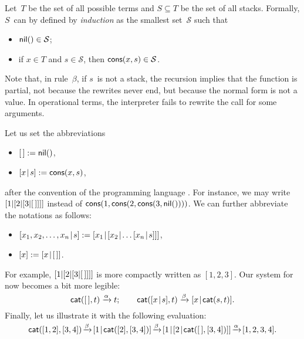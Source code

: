 Let~\(T\) be the set of all possible terms and \(S \subseteq T\) be
the set of all stacks. Formally, \(S\)~can by defined by
\emph{induction} as the smallest set~\(\mathcal{S}\) such
that
\begin{itemize}

  \item \(\textsf{nil}() \in \mathcal{S}\);\label{def:stack}

  \item if \(x \in T\) and \(s \in \mathcal{S}\), then
    \(\textsf{cons}(x,s) \in \mathcal{S}\).

\end{itemize}

Note that, in rule~\(\beta\), if \(s\)~is not a stack, the recursion
implies that the function  is partial, not because the
rewrites never end, but because the normal form is not a value. In operational terms, the
interpreter fails to rewrite the call for some arguments.

Let us set the abbreviations
\begin{itemize}

  \item \([\,] := \textsf{nil}()\),

  \item \([{x}\!\mid\!{s}] := \textsf{cons}(x,s)\),

\end{itemize}
after the convention of the programming language \Prolog
\citep{SterlingShapiro_1994,Bratko_2000}. For instance, we may write
\([1|[2|[3|[\,]]]]\) instead of
\(\textsf{cons}(1,\textsf{cons}(2,\textsf{cons}(3,\textsf{nil}())))\).  We can
further abbreviate the notations as follows:
\begin{itemize}

  \item \(\cons{x_1,x_2,\dots,x_n}{s} := \cons{x_1}{\cons{x_2}{\dots
      \cons{x_n}{s}}}\),

  \item \([x] := [{x}\!\mid\!{[\,]}]\).

\end{itemize}
For example, \([1|[2|[3|[\,]]]]\) is more compactly written as
\([1,2,3]\). Our system for  now
becomes a bit more legible:
\begin{equation}
\fun{cat}(        \el,t) \xrightarrow{\smash{\alpha}} t;\qquad
\fun{cat}(\cons{x}{s},t) \xrightarrow{\smash{\beta}}
\cons{x}{\fun{cat}(s,t)}.
\label{def:cat}\index{stack!concatenation!definition}
\end{equation}
Finally, let us illustrate it with the following
evaluation:
\begin{equation*}
\fun{cat}([1,2],[3,4])
\!\xrightarrow{\smash{\beta}}\!
\cons{1}{\fun{cat}([2],[3,4])}
\!\xrightarrow{\smash{\beta}}\!
\cons{1}{\cons{2}{\fun{cat}(\el,[3,4])}}
\!\xrightarrow{\smash{\alpha}}\!
[1,2,3,4].
\end{equation*}

